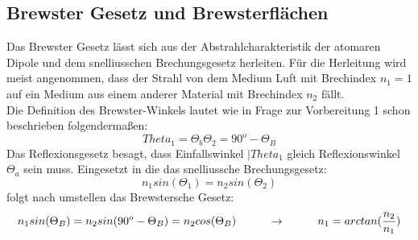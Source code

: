 \subsection*{Brewster Gesetz und Brewsterflächen}
Das Brewster Gesetz lässt sich aus der Abstrahlcharakteristik der atomaren Dipole und dem snelliusschen Brechungsgesetz herleiten. Für die Herleitung wird meist angenommen, dass der  Strahl von dem Medium Luft mit Brechindex $n_1=1$ auf ein Medium aus einem anderer Material mit Brechindex $n_2$ fällt.\\
Die Definition des Brewster-Winkels lautet wie in Frage zur Vorbereitung 1 schon beschrieben folgendermaßen:
\begin{equation}
Theta_1=\Theta_b\Theta_2=90^o-\Theta_B
\end{equation}
Das Reflexionsgesetz besagt, dass Einfallswinkel $|Theta_1$ gleich Reflexionswinkel $\Theta_a$ sein muss. 
Eingesetzt in die das snelliussche Brechungsgesetz: 
\begin{equation}
n_1sin(\Theta_1)=n_2sin(\Theta_2)
\end{equation}
folgt nach umstellen das Brewstersche Gesetz:
\begin{equation}
n_1sin(\Theta_B)=n_2sin(90^o-\Theta_B)=n_2cos(\Theta_B) \tab \rightarrow \tab n_1=arctan(\frac{n_2}{n_1})
\end{equation}

